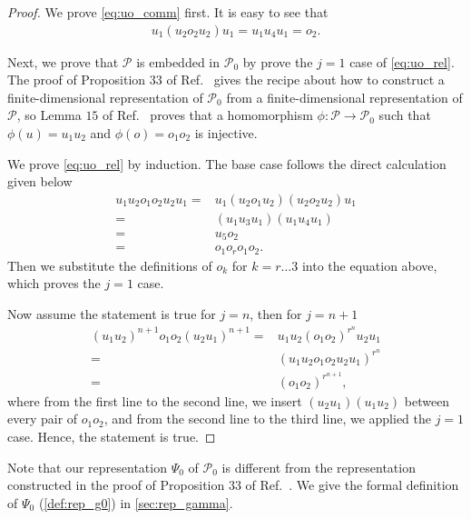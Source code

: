 \documentclass[11pt,letterpaper]{article}
\newcommand{\1}{\mathbb{1}}
\newcommand{\Pg}{\mathcal{P}}
\theoremstyle{definition}
\begin{document}
\begin{proof}
    We prove \cref{eq:uo_comm} first. It is easy to see that
    \begin{align}
        u_1 (u_2o_2u_2) u_1 = u_1u_4u_1 =o_2.
    \end{align}
    
    Next, we prove that $\Pg$ is embedded in $\Pg_0$ by prove the $j = 1$ case of \cref{eq:uo_rel}.
    The proof of Proposition $33$ of Ref.~\cite{slofstra2017} gives the recipe about
    how to construct a finite-dimensional representation of $\Pg_0$ from a 
    finite-dimensional representation of $\Pg$, so Lemma $15$ of Ref.~\cite{slofstra2017}
    proves that a homomorphism $\phi: \Pg \rightarrow \Pg_0$ such that $\phi(u) = u_1u_2$ and 
    $\phi(o) = o_1o_2$ is injective.
    
	We prove \cref{eq:uo_rel} by induction.
	The base case follows the direct calculation given below
	\begin{align*} 
		u_1u_2 o_1o_2 u_2u_1 = &u_1 (u_2 o_1u_2) (u_2o_2 u_2) u_1 \\
	=& (u_1 u_3 u_1) (u_1 u_4 u_1)\\
	=& u_5 o_2\\
	=& o_1o_ro_1 o_2.
	\end{align*}
	Then we substitute the definitions of $o_k$ for $k = r \dots 3$ into the equation above, which 
	proves the $j=1$ case.
	
	Now assume the statement is true for $j = n$, then for $j = n+1$
	\begin{align*}
		(u_1u_2)^{n+1} o_1o_2 (u_2u_1)^{n+1} =& u_1u_2 (o_1o_2)^{r^n} u_2u_1 \\ 
		 =& (u_1u_2 o_1o_2 u_2u_1)^{r^n} \\
		 =& (o_1o_2)^{r^{n+1}},
	\end{align*}
	where from the first line to the second line, we insert $(u_2u_1)(u_1u_2)$ between every pair of $o_1o_2$, and
	from the second line to the third line, we applied the $j=1$ case. Hence, the statement is true.
\end{proof}
Note that our representation $\Psi_0$ of $\Pg_0$ is different from the representation
constructed in the proof of Proposition $33$ of Ref.~\cite{slofstra2017}.
We give the formal definition of $\Psi_0$ (\cref{def:rep_g0}) in \cref{sec:rep_gamma}.
\end{document}
